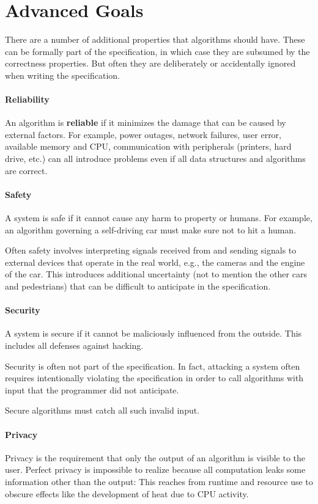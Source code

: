\section{Advanced Goals}

There are a number of additional properties that algorithms should have.
These can be formally part of the specification, in which case they are subsumed by the correctness properties.
But often they are deliberately or accidentally ignored when writing the specification.

\paragraph{Reliability}
An algorithm is \textbf{reliable} if it minimizes the damage that can be caused by external factors.
For example, power outages, network failures, user error, available memory and CPU, communication with peripherals (printers, hard drive, etc.) can all introduce problems even if all data structures and algorithms are correct.

\paragraph{Safety}
A system is safe if it cannot cause any harm to property or humans.
For example, an algorithm governing a self-driving car must make sure not to hit a human.

Often safety involves interpreting signals received from and sending signals to external devices that operate in the real world, e.g., the cameras and the engine of the car.
This introduces additional uncertainty (not to mention the other cars and pedestrians) that can be difficult to anticipate in the specification.

\paragraph{Security}
A system is secure if it cannot be maliciously influenced from the outside.
This includes all defenses against hacking.

Security is often not part of the specification.
In fact, attacking a system often requires intentionally violating the specification in order to call algorithms with input that the programmer did not anticipate.

Secure algorithms must catch all such invalid input.

\paragraph{Privacy}
Privacy is the requirement that only the output of an algorithm is visible to the user.
Perfect privacy is impossible to realize because all computation leaks some information other than the output: This reaches from runtime and resource use to obscure effects like the development of heat due to CPU activity.

